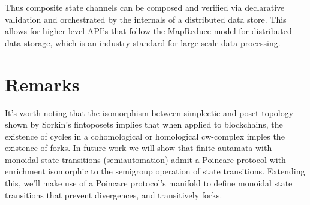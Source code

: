 \documentclass{article}
\begin{document}
Thus composite state channels can be composed and verified via declarative validation and orchestrated by the internals of a distributed data store. This allows for higher level API's that follow the MapReduce model for distributed data storage, which is an industry standard for large scale data processing. 





\section{Remarks} 
It's worth noting that the isomorphism between simplectic and poset topology shown by Sorkin's fintoposets implies that when applied to blockchains, the existence of cycles in a cohomological or homological cw-complex imples the existence of forks. In future work we will show that finite autamata with monoidal state transitions (semiautomation) admit a Poincare protocol with enrichment isomorphic to the semigroup operation of state transitions. Extending this, we'll make use of a Poincare protocol's manifold to define monoidal state transitions that prevent divergences, and transitively forks.


\end{document}
